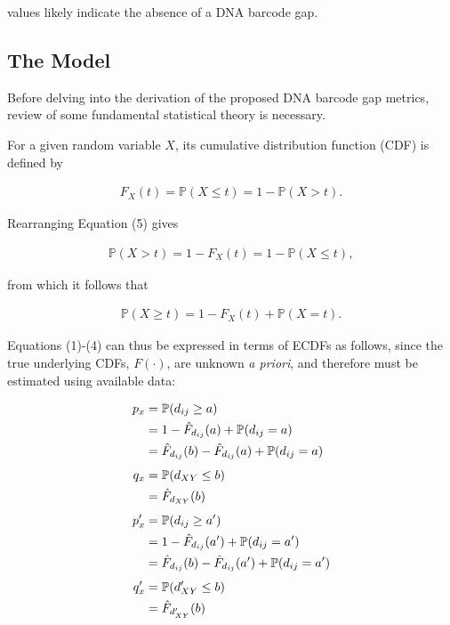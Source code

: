 \documentclass[12pt]{article}
\begin{document}
values likely indicate the absence of a DNA barcode gap. 

\subsection{The Model}

Before delving into the derivation of the proposed DNA barcode gap metrics, review of some fundamental statistical theory is necessary.

For a given random variable $X$, its cumulative distribution function (CDF) is defined by

\begin{align}
F_X(t) = \mathbb{P}(X \leq t) = 1 - \mathbb{P}(X > t). 
\end{align}

\noindent Rearranging Equation (5) gives

\begin{align}
\mathbb{P}(X > t) = 1 - F_X(t) = 1 - \mathbb{P}(X \leq t) ,
\end{align}

\noindent from which it follows that

\begin{align}
\mathbb{P}(X \geq t) = 1 - F_X(t) + \mathbb{P}(X = t).
\end{align}

Equations (1)-(4) can thus be expressed in terms of ECDFs as follows, since the true underlying CDFs, $F(\cdot)$, are unknown \textit{a priori}, and therefore must be estimated using available data:

\begin{align}
p_x  &= \mathbb{P}(d_{ij} \geq a) \notag \\
     &= 1 - \hat{F}_{d_{ij}}(a) + \mathbb{P}(d_{ij} = a) \notag \\
     &= \hat{F}_{d_{ij}}(b) - \hat{F}_{d_{ij}}(a) +  \mathbb{P}(d_{ij} = a) \\[1ex]
q_x  &=  \mathbb{P}(d_{XY} \leq b) \notag \\
     &= \hat{F}_{d_{XY}}(b) \\[1ex]
p'_x &=  \mathbb{P}(d_{ij} \geq a') \notag \\
     &= 1 - \hat{F}_{d_{ij}}(a') +  \mathbb{P}(d_{ij} = a') \notag \\
     &= \hat{F}_{d_{ij}}(b) - \hat{F}_{d_{ij}}(a') +  \mathbb{P}(d_{ij} = a')  \\[1ex]
q'_x &=  \mathbb{P}(d'_{XY} \leq b) \notag \\
     &= \hat{F}_{d'_{XY}}(b)
\end{align}
\end{document}
